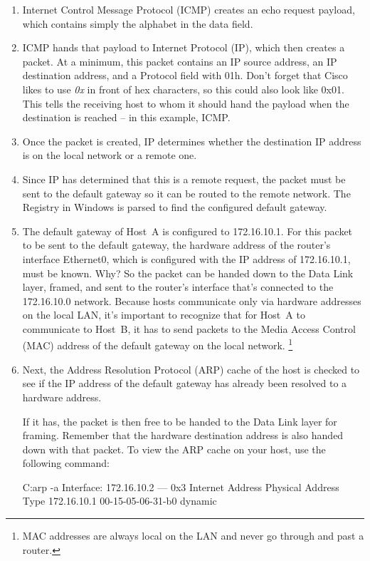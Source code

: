 \begin{enumerate}
\item
  Internet Control Message Protocol (ICMP) creates an echo request
  payload, which contains simply the alphabet in the data field.
\item
  ICMP hands that payload to Internet Protocol (IP), which then creates
  a packet. At a minimum, this packet contains an IP source address, an
  IP destination address, and a Protocol field with 01h. Don't forget
  that Cisco likes to use \emph{0x} in front of hex characters, so this
  could also look like 0x01. This tells the receiving host to whom it
  should hand the payload when the destination is reached -- in this
  example, ICMP.
\item
  Once the packet is created, IP determines whether the destination IP
  address is on the local network or a remote one.
\item
  Since IP has determined that this is a remote request, the packet must
  be sent to the default gateway so it can be routed to the remote
  network. The Registry in Windows is parsed to find the configured
  default gateway.
\item
   The default gateway of Host~A is configured to 172.16.10.1.
   For this packet to be sent to the default gateway, the hardware address of the router's interface Ethernet0, which is configured with the IP address of 172.16.10.1, must be known.
   Why? So the packet can be handed down to the Data Link layer, framed, and sent to the router's interface
   that's connected to the 172.16.10.0 network.
   Because hosts communicate only via hardware addresses on the local LAN, it's important to
   recognize that for Host~A to communicate to Host~B, it has to send packets to the Media Access Control (MAC) address of the default
   gateway on the local network.%
      \footnote{MAC addresses are always local on the LAN and never go through and past a router.}
\item
  Next, the Address Resolution Protocol (ARP) cache of the host is
  checked to see if the IP address of the default gateway has already
  been resolved to a hardware address.

  If it has, the packet is then free to be handed to the Data Link layer
  for framing. Remember that the hardware destination address is also
  handed down with that packet. To view the ARP cache on your host, use
  the following command:

\begin{cli}
C:\>arp -a
Interface: 172.16.10.2 --- 0x3
  Internet Address      Physical Address      Type
  172.16.10.1          00-15-05-06-31-b0     dynamic
\end{cli}


\end{enumerate}
